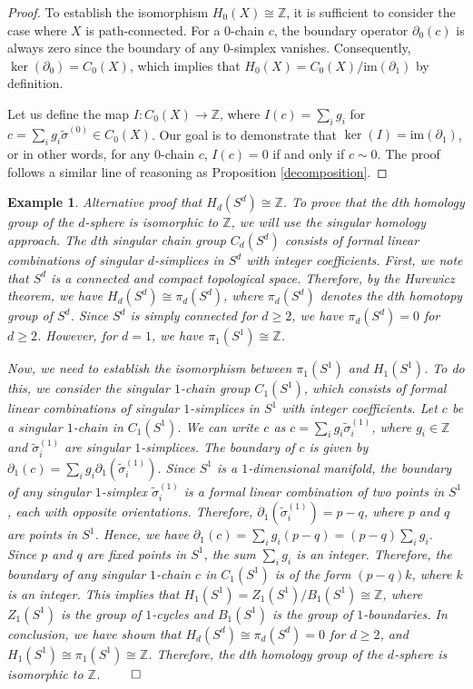 \documentclass{amsart}
\newtheorem{example}[definition]{Example}
\begin{document}
\begin{proof}
To establish the isomorphism $H_0(X) \cong \mathbb{Z}$, it is sufficient to consider the case where $X$ is path-connected. For a $0$-chain $c$, the boundary operator $\partial_0(c)$ is always zero since the boundary of any $0$-simplex vanishes. Consequently, $\ker(\partial_0) = C_0(X)$, which implies that $H_0(X) = C_0(X) / \text{im}(\partial_1)$ by definition.

Let us define the map $I: C_0(X) \rightarrow \mathbb{Z}$, where $I(c) = \sum_i g_i$ for $c = \sum_i g_i \tilde{\sigma}^{(0)} \in C_0(X)$. Our goal is to demonstrate that $\ker(I) = \text{im}(\partial_1)$, or in other words, for any $0$-chain $c$, $I(c) = 0$ if and only if $c \sim 0$. The proof follows a similar line of reasoning as Proposition \ref{decomposition}.
\end{proof}

\begin{example}
Alternative proof that $H_d(S^d) \cong \mathbb{Z}$. To prove that the $d$th homology group of the $d$-sphere is isomorphic to $\mathbb{Z}$, we will use the singular homology approach. The $d$th singular chain group $C_d(S^d)$ consists of formal linear combinations of singular $d$-simplices in $S^d$ with integer coefficients. First, we note that $S^d$ is a connected and compact topological space. Therefore, by the Hurewicz theorem, we have $H_d(S^d) \cong \pi_d(S^d)$, where $\pi_d(S^d)$ denotes the $d$th homotopy group of $S^d$. Since $S^d$ is simply connected for $d \geq 2$, we have $\pi_d(S^d) = 0$ for $d \geq 2$. However, for $d = 1$, we have $\pi_1(S^1) \cong \mathbb{Z}$.

Now, we need to establish the isomorphism between $\pi_1(S^1)$ and $H_1(S^1)$. To do this, we consider the singular $1$-chain group $C_1(S^1)$, which consists of formal linear combinations of singular $1$-simplices in $S^1$ with integer coefficients. Let $c$ be a singular $1$-chain in $C_1(S^1)$. We can write $c$ as $c = \sum_{i} g_i \tilde{\sigma}^{(1)}_i$, where $g_i \in \mathbb{Z}$ and $\tilde{\sigma}^{(1)}_i$ are singular $1$-simplices. The boundary of $c$ is given by $\partial_1(c) = \sum_{i} g_i \partial_1(\tilde{\sigma}^{(1)}_i)$. Since $S^1$ is a $1$-dimensional manifold, the boundary of any singular $1$-simplex $\tilde{\sigma}^{(1)}_i$ is a formal linear combination of two points in $S^1$, each with opposite orientations. Therefore, $\partial_1(\tilde{\sigma}^{(1)}_i) = p - q$, where $p$ and $q$ are points in $S^1$. Hence, we have $\partial_1(c) = \sum_{i} g_i (p - q) = (p - q) \sum_{i} g_i$. Since $p$ and $q$ are fixed points in $S^1$, the sum $\sum_{i} g_i$ is an integer. Therefore, the boundary of any singular $1$-chain $c$ in $C_1(S^1)$ is of the form $(p - q)k$, where $k$ is an integer. This implies that $H_1(S^1) = Z_1(S^1) / B_1(S^1) \cong \mathbb{Z}$, where $Z_1(S^1)$ is the group of $1$-cycles and $B_1(S^1)$ is the group of $1$-boundaries. In conclusion, we have shown that $H_d(S^d) \cong \pi_d(S^d) = 0$ for $d \geq 2$, and $H_1(S^1) \cong \pi_1(S^1) \cong \mathbb{Z}$. Therefore, the $d$th homology group of the $d$-sphere is isomorphic to $\mathbb{Z}$. $\qed$
\end{example}
\end{document}
